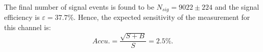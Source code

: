 \documentclass[11pt,a4paper]{cepcnote}
\begin{document}
The final number of signal events is found to be $N_{sig} = 9022\pm224 $
and the signal efficiency is $\varepsilon = 37.7\%$. 
Hence, the expected sensitivity of the measurement for this channel is:
\begin{equation*}
Accu.=\frac{\sqrt{S+B}}{S} = 2.5\%.
\end{equation*}

%
%



%
%


%
%
\end{document}
